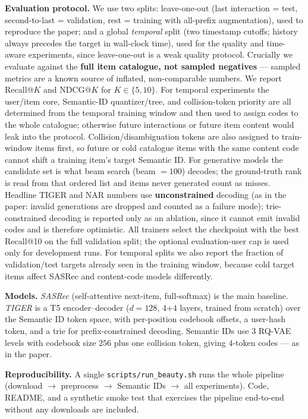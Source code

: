 \documentclass[10pt]{article}
\begin{document}
\textbf{Evaluation protocol.} We use two splits: leave-one-out (last interaction
= test, second-to-last = validation, rest = training with all-prefix
augmentation), used to reproduce the paper; and a global \emph{temporal} split
(two timestamp cutoffs; history always precedes the target in wall-clock time),
used for the quality and time-aware experiments, since leave-one-out is a weak
quality protocol. Crucially we evaluate against the \textbf{full item catalogue,
not sampled negatives} --- sampled metrics are a known source of inflated,
non-comparable numbers. We report Recall@$K$ and NDCG@$K$ for $K\in\{5,10\}$.
For temporal experiments the user/item core, Semantic-ID quantizer/tree, and
collision-token priority are all determined from the temporal training window and
then used to assign codes to the whole catalogue; otherwise future interactions
or future item content would leak into the protocol.
Collision/disambiguation tokens are also assigned to train-window items first,
so future or cold catalogue items with the same content code cannot shift a
training item's target Semantic ID.
For generative models the candidate set is what beam search (beam $=100$)
decodes; the ground-truth rank is read from that ordered list and items never
generated count as misses. Headline TIGER and NAR numbers use
\textbf{unconstrained} decoding (as in the paper: invalid generations are
dropped and counted as a failure mode); trie-constrained decoding is reported
only as an ablation, since it cannot emit invalid codes and is therefore
optimistic. All trainers select the checkpoint with the best Recall@10 on the
full validation split; the optional evaluation-user cap is used only for
development runs. For temporal splits we also report the fraction of
validation/test targets already seen in the training window, because cold target
items affect SASRec and content-code models differently.

\textbf{Models.} \emph{SASRec} (self-attentive next-item, full-softmax) is the
main baseline. \emph{TIGER} is a T5 encoder--decoder ($d{=}128$, 4+4 layers,
trained from scratch) over the Semantic ID token space, with per-position
codebook offsets, a user-hash token, and a trie for prefix-constrained decoding.
Semantic IDs use $3$ RQ-VAE levels with codebook size $256$ plus one collision
token, giving $4$-token codes --- as in the paper.

\textbf{Reproducibility.} A single \texttt{scripts/run\_beauty.sh} runs the whole
pipeline (download $\rightarrow$ preprocess $\rightarrow$ Semantic IDs
$\rightarrow$ all experiments). Code, README, and a synthetic smoke test that
exercises the pipeline end-to-end without any downloads are included.
\end{document}
